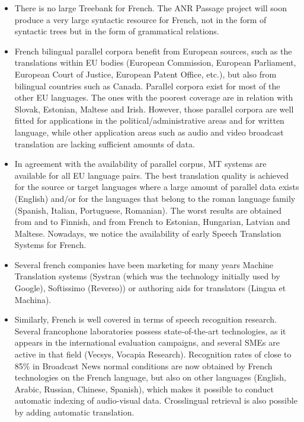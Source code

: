 \begin{multicols}{2}
\begin{itemize}
\item There is no large Treebank for French. The ANR Passage project will
soon produce a very large syntactic resource for French, not in the
form of syntactic trees but in the form of grammatical relations.

\item French bilingual parallel corpora benefit from European sources, such
as the translations within EU bodies (European Commission, European
Parliament, European Court of Justice, European Patent Office, etc.),
but also from bilingual countries such as Canada. Parallel corpora
exist for most of the other EU languages. The ones with the poorest
coverage are in relation with Slovak, Estonian, Maltese and
Irish. However, those parallel corpora are well fitted for
applications in the political/administrative areas and for written
language, while other application areas such as audio and video
broadcast translation are lacking sufficient amounts of data.

\item In agreement with the availability of parallel corpus, MT
  systems are available for all EU language pairs. The best
  translation quality is achieved for the source or target languages
  where a large amount of parallel data exists (English) and/or for
  the languages that belong to the roman language family (Spanish,
  Italian, Portuguese, Romanian). The worst results are obtained from
  and to Finnish, and from French to Estonian, Hungarian, Latvian and
  Maltese. Nowadays, we notice the availability of early Speech Translation
  Systems for French.

\item Several french companies have been marketing for many years
  Machine Translation systems (Systran (which was the technology
  initially used by Google), Softissimo (Reverso)) or authoring aids
  for translators (Lingua et Machina).

\item Similarly, French is well covered in terms of speech recognition
  research. Several francophone laboratories possess state-of-the-art technologies, as it
  appears in the international evaluation campaigns, and several SMEs
  are active in that field (Vecsys, Vocapia Research). Recognition
  rates of close to 85\% in Broadcast News normal conditions are now
  obtained by French technologies on the French language, but also on
  other languages (English, Arabic, Russian, Chinese, Spanish), which
  makes it possible to conduct automatic indexing of audio-visual
  data. Crosslingual retrieval is also possible by adding automatic
  translation.


\end{itemize}
\end{multicols}
